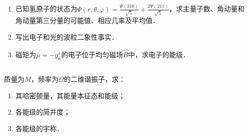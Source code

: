 
\subsection{ }
\begin{enumerate}
\item 已知氢原子的状态为$\varPsi (r,\theta,\varphi)=\frac{\varPsi (310)}{\sqrt{5}}+\frac{2\varPsi (211)}{\sqrt{5}}$，求主量子数、角动量和角动量第三分量的可能值、相应几率及平均值．
\item 写出电子和光的波粒二象性事实．
\item 磁矩为$\bar{\mu}=-g^{\bar{s}}_{n}$的电子位于均匀磁场$\vec{B}$中，求电子的能级．
\end{enumerate}
\subsection{ }
质量为$M$，频率为$\Omega$的二维谐振子，求：\\
\begin{enumerate}
\item 其哈密顿量，其能量本征态和能级；
\item 各能级的简并度；
\item 各能级的宇称．
\end{enumerate}
